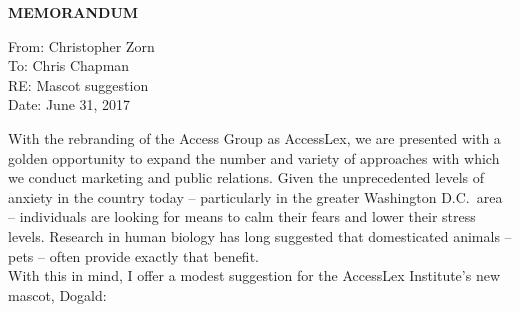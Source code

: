 \documentclass[12pt,titlepage]{article}
\begin{document}

\begin{center}
{\bf MEMORANDUM} \\
\end{center}

\medskip

\noindent From: Christopher Zorn \\

\noindent To: Chris Chapman \\

\noindent RE: Mascot suggestion \\

\noindent Date: June 31, 2017  \\


\bigskip

\noindent With the rebranding of the Access Group as AccessLex, we are presented with a golden opportunity to expand the number and variety of approaches with which we conduct marketing and public relations. Given the unprecedented levels of anxiety in the country today -- particularly in the greater Washington D.C.\ area -- individuals are looking for means to calm their fears and lower their stress levels. Research in human biology has long suggested that domesticated animals -- pets -- often provide exactly that benefit. \\

\noindent With this in mind, I offer a modest suggestion for the AccessLex Institute's new mascot, Dogald:

\bigskip

\begin{center}
\end{center}


\end{document}

